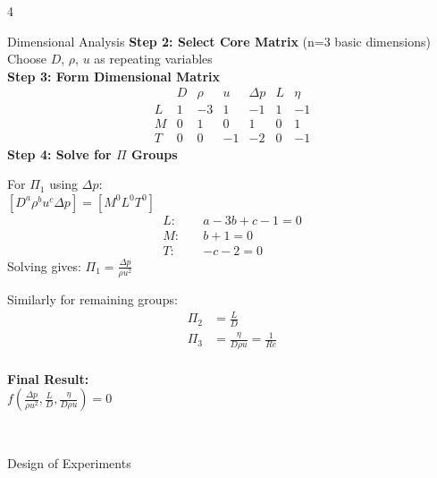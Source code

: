 \documentclass[10pt]{article}
\begin{document}
\begin{multicols*}{4}
\begin{conceptbox}[r1]{Dimensional Analysis}
		\textbf{Step 2: Select Core Matrix} (n=3 basic dimensions)\\
		Choose $D$, $\rho$, $u$ as repeating variables\\

		\textbf{Step 3: Form Dimensional Matrix}\\
		\begin{equation*}
			\begin{array}{c|ccc|ccc}
				  & D & \rho & u  & \Delta p & L & \eta \\
				\hline
				L & 1 & -3   & 1  & -1       & 1 & -1   \\
				M & 0 & 1    & 0  & 1        & 0 & 1    \\
				T & 0 & 0    & -1 & -2       & 0 & -1
			\end{array}
		\end{equation*}
		\textbf{Step 4: Solve for $\Pi$ Groups}\\
		\begin{minipage}{0.55\linewidth}
			For $\Pi_1$ using $\Delta p$: \\
			$[D^a \rho^b u^c \Delta p]=[M^0L^0T^0]$\\[-2em]
			\begin{align*}
				L:\quad & a - 3b + c - 1 = 0 \\
				M:\quad & b + 1 = 0          \\
				T:\quad & -c - 2 = 0
			\end{align*}
			Solving gives: $\Pi_1 = \frac{\Delta p}{\rho u^2}$\\
		\end{minipage}
		\hfill
		\begin{minipage}{0.44\linewidth}
			Similarly for remaining groups:\\[-2.5em]
			\begin{align*}
				\Pi_2 & = \frac{L}{D}                         \\
				\Pi_3 & = \frac{\eta}{D\rho u} = \frac{1}{Re}
			\end{align*}\\[-1.5em]
			\textbf{Final Result:}\\[0.5em]
			$f(\frac{\Delta p}{\rho u^2}, \frac{L}{D}, \frac{\eta}{D\rho u}) = 0$
		\end{minipage}\\
	\end{conceptbox}
	\vspace{-2em}
	\begin{conceptbox}[o1]{Design of Experiments}
		\begin{minipage}{0.52\textwidth}

\end{minipage}
\end{conceptbox}
\end{multicols*}
\end{document}
